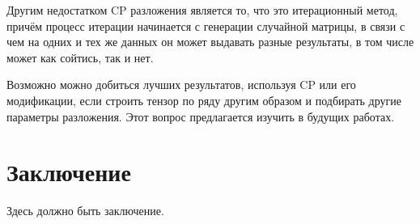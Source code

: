 \documentclass[specialist,
    substylefile = spbu_report.rtx,
    subf,href,colorlinks=true, 12pt]{disser}
\theoremstyle{plain}
\theoremstyle{definition}
\theoremstyle{remark}
\begin{document}
    Другим недостатком CP разложения является то, что это итерационный метод, причём процесс итерации начинается
    с генерации случайной матрицы, в связи с чем на одних и тех же данных он может выдавать разные результаты, в том
    числе может как сойтись, так и нет.

    Возможно можно добиться лучших результатов, используя CP или его модификации, если строить тензор по ряду другим образом и подбирать
    другие параметры разложения.
    Этот вопрос предлагается изучить в будущих работах.
    \newpage


    \section{Заключение}\label{sec:conclusion}
    Здесь должно быть заключение.

    
    
\end{document}
